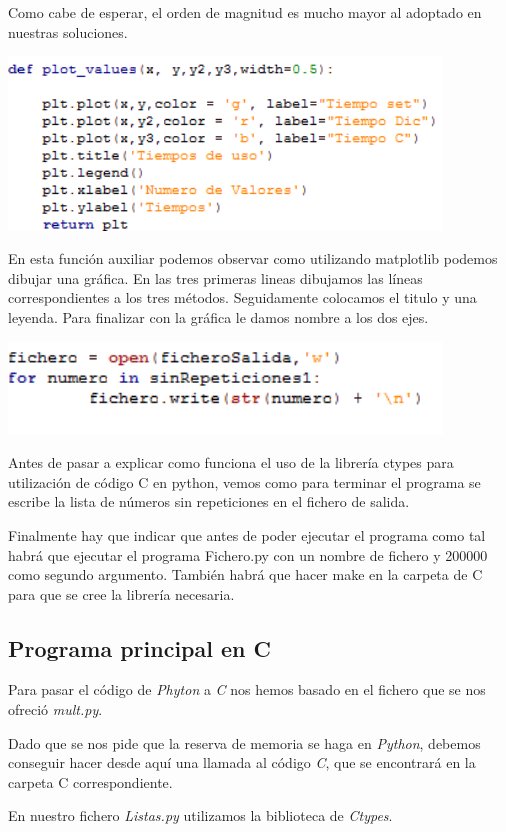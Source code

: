 \documentclass{article}
\begin{document}
Como cabe de esperar, el orden de magnitud es mucho mayor al adoptado en nuestras soluciones.

\includegraphics[width=11.5cm]{dibujarGrafica.PNG}

En esta función auxiliar podemos observar como utilizando matplotlib podemos dibujar una gráfica. En las tres primeras lineas dibujamos las líneas correspondientes a los tres métodos. Seguidamente colocamos el titulo y una leyenda. Para finalizar con la gráfica le damos nombre a los dos ejes.

\includegraphics[width=11.5cm]{EscrituraFichero.PNG}

Antes de pasar a explicar como funciona el uso de la librería ctypes para utilización de código C en python, vemos como para terminar el programa se escribe la lista de números sin repeticiones en el fichero de salida.

Finalmente hay que indicar que antes de poder ejecutar el programa como tal habrá que ejecutar el programa Fichero.py con un nombre de fichero y 200000 como segundo argumento. También habrá que hacer make en la carpeta de C para que se cree la librería necesaria.

\subsection{Programa principal en C}
Para pasar el código de \textit{Phyton} a \textit{C} nos hemos basado en el fichero que se nos ofreció \textit{mult.py}.

Dado que se nos pide que la reserva de memoria se haga en \textit{Python}, debemos conseguir hacer desde aquí una llamada al código \textit{C}, que se encontrará en la carpeta C correspondiente.

En nuestro fichero \textit{Listas.py} utilizamos la biblioteca de \textit{Ctypes}.
\end{document}
